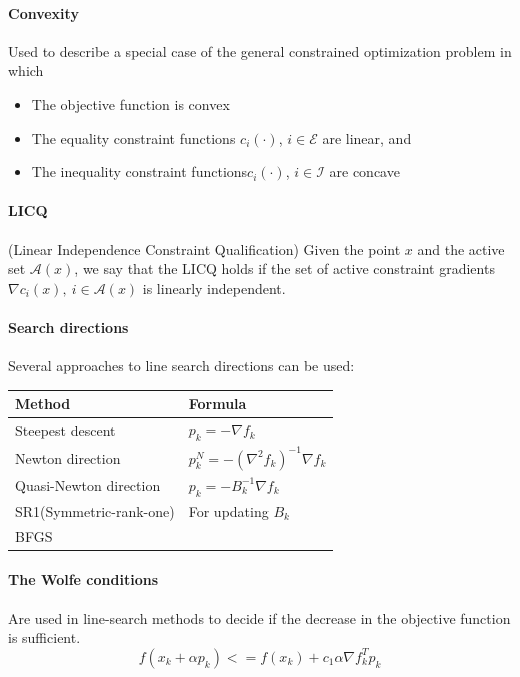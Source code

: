 
\paragraph{Convexity} Used to describe a special case of the general constrained optimization problem in which
\begin{itemize}[nolistsep,noitemsep]
    \item The objective function is convex
    \item The equality constraint functions $c_i(\cdot)$, $i \in \mathcal{E}$ are linear, and
    \item The inequality constraint functions$c_i(\cdot)$, $i \in \mathcal{I}$ are concave
\end{itemize}

\paragraph{LICQ} (Linear Independence Constraint Qualification) Given the point $x$ and the active set $\mathcal{A}(x)$, we say that the LICQ holds if the set of active constraint gradients $\nabla c_i (x), \: i \in \mathcal{A}(x)$ is linearly independent.

\paragraph{Search directions}  Several approaches to line search directions can be used:

\hskip-0.5cm
\begin{tabularx}{\linewidth}{X X}
	\textbf{Method} & \textbf{Formula}\\
	\hline
	Steepest descent & $p_k=-\nabla f_k$\\
	Newton direction & $p_k^N=-(\nabla^2 f_k)^{-1}\nabla f_k$ \\
	Quasi-Newton direction & $p_k=-B_k^{-1}\nabla f_k$ \\
	\quad SR1(Symmetric-rank-one) & For updating $B_k$\\
	\quad BFGS & \\
\end{tabularx}

\paragraph{The Wolfe conditions} 
Are used in line-search methods to decide if the decrease in the objective function is sufficient.
\begin{equation}
    f(x_k+\alpha p_k) <= f(x_k) + c_1 \alpha \nabla f_k^T p_k
\end{equation}


